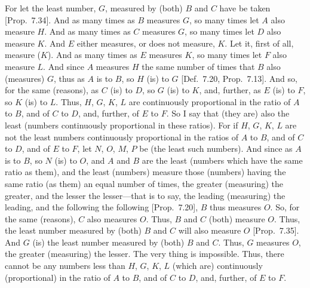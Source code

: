 \begin{Parallel}{}{}
{For let the least number, $G$,  measured by (both) $B$ and $C$ have
be taken [Prop.~7.34]. And as many times
as $B$ measures $G$, so many times let $A$ also measure $H$.
And as many times as $C$ measures $G$, so many times let
$D$ also measure $K$. And $E$ either measures, or does not measure, $K$.
Let it, first of all, measure ($K$). And as many times as $E$ measures
$K$, so many times let $F$ also measure $L$. And since $A$
measures $H$ the same number of times that $B$ also (measures) $G$, thus as $A$ is to $B$, so $H$ (is) to $G$ [Def.~7.20, Prop.~7.13].
And so, for the same (reasons), as $C$ (is) to $D$, so
$G$ (is) to $K$, and, further, as $E$ (is) to $F$, so $K$ (is) to $L$.
Thus, $H$, $G$, $K$, $L$ are continuously proportional in the ratio
of $A$ to $B$, and of $C$ to $D$, and, further,  of $E$ to $F$. So I say that (they are) also the least
(numbers continuously proportional in these ratios). For if
$H$, $G$, $K$, $L$ are not the least numbers continuously proportional
 in the ratios of $A$ to $B$, and of $C$ to $D$, and of
$E$ to $F$, let $N$, $O$, $M$, $P$ be (the least such numbers). 
And since as $A$ is to $B$, so $N$ (is) to $O$, and $A$ and $B$ are the
least (numbers which have the same ratio as them), and the least (numbers) measure those (numbers)
having the same ratio (as them) an equal number of times, the greater (measuring) the greater, and the lesser the lesser---that is to say, the leading (measuring) the leading, and the
following the following [Prop.~7.20], $B$ thus
measures $O$. So, for the same (reasons), $C$ also measures $O$. Thus,
$B$ and $C$ (both) measure $O$. Thus, the least number measured by
(both) $B$ and $C$ will also measure $O$ [Prop.~7.35]. And $G$ (is) the least number measured by (both) $B$ and $C$. Thus, $G$ measures $O$, the greater
(measuring) the lesser. The very thing is impossible. Thus, there
cannot be any numbers less than $H$, $G$, $K$, $L$ 
(which are) continuously (proportional) in the ratio of $A$ to $B$, and of $C$ to $D$, and, further, of $E$ to $F$.

\epsfysize=2.5in
\centerline{}

}
\end{Parallel}
